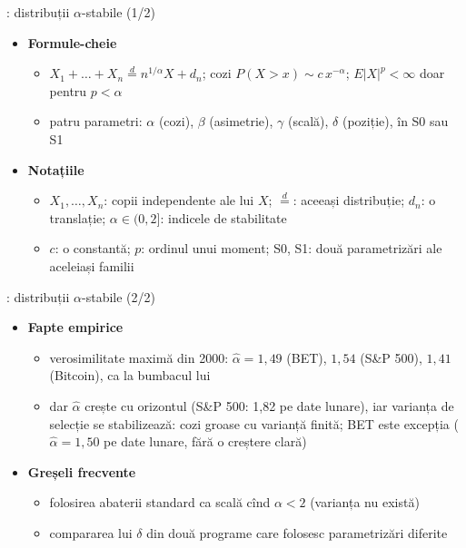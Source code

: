 \begin{frame}{: distribuții $\alpha$-stabile (1/2)}
\itemsize{\small}
\begin{itemize}
    \item \textbf{Formule-cheie}
    \begin{itemize}
        \item $X_1 + \dots + X_n \overset{d}{=} n^{1/\alpha}X + d_n$; cozi $P(X > x) \sim c\,x^{-\alpha}$; $E|X|^p < \infty$ doar pentru $p < \alpha$
        \item patru parametri: $\alpha$ (cozi), $\beta$ (asimetrie), $\gamma$ (scală), $\delta$ (poziție), în S0 sau S1 
    \end{itemize}
    \item \textbf{Notațiile}
    \begin{itemize}
        \item $X_1, \dots, X_n$: copii independente ale lui $X$; $\overset{d}{=}$: aceeași distribuție; $d_n$: o translație; $\alpha \in (0, 2]$: indicele de stabilitate
        \item $c$: o constantă; $p$: ordinul unui moment; S0, S1: două parametrizări ale aceleiași familii
    \end{itemize}
\end{itemize}
\end{frame}

\begin{frame}{: distribuții $\alpha$-stabile (2/2)}
\itemsize{\small}
\begin{itemize}
    \item \textbf{Fapte empirice}
    \begin{itemize}
        \item verosimilitate maximă din 2000: $\hat\alpha = 1{,}49$ (BET), $1{,}54$ (S\&P 500), $1{,}41$ (Bitcoin), ca la bumbacul lui 
        \item dar $\hat\alpha$ crește cu orizontul (S\&P 500: 1{,}82 pe date lunare), iar varianța de selecție se stabilizează: cozi groase cu varianță finită; BET este excepția ($\hat\alpha = 1{,}50$ pe date lunare, fără o creștere clară)
    \end{itemize}
    \item \textbf{Greșeli frecvente}
    \begin{itemize}
        \item folosirea abaterii standard ca scală cînd $\alpha < 2$ (varianța nu există)
        \item compararea lui $\delta$ din două programe care folosesc parametrizări diferite
    \end{itemize}
\end{itemize}
\end{frame}


